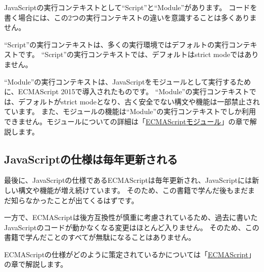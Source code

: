 JavaScriptの実行コンテキストとして``Script''と``Module''があります。
コードを書く場合には、この2つの実行コンテキストの違いを意識することは多くありません。

``Script''の実行コンテキストは、多くの実行環境ではデフォルトの実行コンテキストです。
``Script''の実行コンテキストでは、デフォルトはstrict
modeではありません。

``Module''の実行コンテキストは、JavaScriptをモジュールとして実行するために、ECMAScript
2015で導入されたものです。
``Module''の実行コンテキストでは、デフォルトがstrict
modeとなり、古く安全でない構文や機能は一部禁止されています。
また、モジュールの機能は``Module''の実行コンテキストでしか利用できません。モジュールについての詳細は「\hyperlink{module}{ECMAScriptモジュール}」の章で解説します。

\hypertarget{ecmascript-updates}{%
\subsection{JavaScriptの仕様は毎年更新される}\label{ecmascript-updates}}

最後に、JavaScriptの仕様であるECMAScriptは毎年更新され、JavaScriptには新しい構文や機能が増え続けています。
そのため、この書籍で学んだ後もまだまだ知らなかったことが出てくるはずです。

一方で、ECMAScriptは後方互換性が慎重に考慮されているため、過去に書いたJavaScriptのコードが動かなくなる変更はほとんど入りません。
そのため、この書籍で学んだことのすべてが無駄になることはありません。

ECMAScriptの仕様がどのように策定されているかについては「\hyperlink{ecmascript}{ECMAScript}」の章で解説します。
